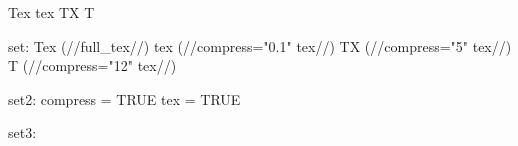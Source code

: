 Tex
tex
TX
T

set:
Tex (//full_tex//)
tex (//compress="0.1" tex//)
TX (//compress="5" tex//)
T (//compress="12" tex//)

set2:
compress = TRUE
tex = TRUE

set3: